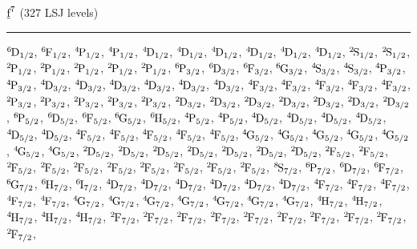 \begin{mdframed}
\begin{center}
$\forb^{7}$
(327 LSJ levels)
\vspace{0.25cm}
\hrule
\vspace{0.25cm}

$\LSJterm{6}{D}{1/2}$, $\LSJterm{6}{F}{1/2}$, $\LSJterm{4}{P}{1/2}$, $\LSJterm{4}{P}{1/2}$, $\LSJterm{4}{D}{1/2}$, $\LSJterm{4}{D}{1/2}$, $\LSJterm{4}{D}{1/2}$, $\LSJterm{4}{D}{1/2}$, $\LSJterm{4}{D}{1/2}$, $\LSJterm{4}{D}{1/2}$, $\LSJterm{2}{S}{1/2}$, $\LSJterm{2}{S}{1/2}$, $\LSJterm{2}{P}{1/2}$, $\LSJterm{2}{P}{1/2}$, $\LSJterm{2}{P}{1/2}$, $\LSJterm{2}{P}{1/2}$, $\LSJterm{2}{P}{1/2}$, $\LSJterm{6}{P}{3/2}$, $\LSJterm{6}{D}{3/2}$, $\LSJterm{6}{F}{3/2}$, $\LSJterm{6}{G}{3/2}$, $\LSJterm{4}{S}{3/2}$, $\LSJterm{4}{S}{3/2}$, $\LSJterm{4}{P}{3/2}$, $\LSJterm{4}{P}{3/2}$, $\LSJterm{4}{D}{3/2}$, $\LSJterm{4}{D}{3/2}$, $\LSJterm{4}{D}{3/2}$, $\LSJterm{4}{D}{3/2}$, $\LSJterm{4}{D}{3/2}$, $\LSJterm{4}{D}{3/2}$, $\LSJterm{4}{F}{3/2}$, $\LSJterm{4}{F}{3/2}$, $\LSJterm{4}{F}{3/2}$, $\LSJterm{4}{F}{3/2}$, $\LSJterm{4}{F}{3/2}$, $\LSJterm{2}{P}{3/2}$, $\LSJterm{2}{P}{3/2}$, $\LSJterm{2}{P}{3/2}$, $\LSJterm{2}{P}{3/2}$, $\LSJterm{2}{P}{3/2}$, $\LSJterm{2}{D}{3/2}$, $\LSJterm{2}{D}{3/2}$, $\LSJterm{2}{D}{3/2}$, $\LSJterm{2}{D}{3/2}$, $\LSJterm{2}{D}{3/2}$, $\LSJterm{2}{D}{3/2}$, $\LSJterm{2}{D}{3/2}$, $\LSJterm{6}{P}{5/2}$, $\LSJterm{6}{D}{5/2}$, $\LSJterm{6}{F}{5/2}$, $\LSJterm{6}{G}{5/2}$, $\LSJterm{6}{H}{5/2}$, $\LSJterm{4}{P}{5/2}$, $\LSJterm{4}{P}{5/2}$, $\LSJterm{4}{D}{5/2}$, $\LSJterm{4}{D}{5/2}$, $\LSJterm{4}{D}{5/2}$, $\LSJterm{4}{D}{5/2}$, $\LSJterm{4}{D}{5/2}$, $\LSJterm{4}{D}{5/2}$, $\LSJterm{4}{F}{5/2}$, $\LSJterm{4}{F}{5/2}$, $\LSJterm{4}{F}{5/2}$, $\LSJterm{4}{F}{5/2}$, $\LSJterm{4}{F}{5/2}$, $\LSJterm{4}{G}{5/2}$, $\LSJterm{4}{G}{5/2}$, $\LSJterm{4}{G}{5/2}$, $\LSJterm{4}{G}{5/2}$, $\LSJterm{4}{G}{5/2}$, $\LSJterm{4}{G}{5/2}$, $\LSJterm{4}{G}{5/2}$, $\LSJterm{2}{D}{5/2}$, $\LSJterm{2}{D}{5/2}$, $\LSJterm{2}{D}{5/2}$, $\LSJterm{2}{D}{5/2}$, $\LSJterm{2}{D}{5/2}$, $\LSJterm{2}{D}{5/2}$, $\LSJterm{2}{D}{5/2}$, $\LSJterm{2}{F}{5/2}$, $\LSJterm{2}{F}{5/2}$, $\LSJterm{2}{F}{5/2}$, $\LSJterm{2}{F}{5/2}$, $\LSJterm{2}{F}{5/2}$, $\LSJterm{2}{F}{5/2}$, $\LSJterm{2}{F}{5/2}$, $\LSJterm{2}{F}{5/2}$, $\LSJterm{2}{F}{5/2}$, $\LSJterm{2}{F}{5/2}$, $\LSJterm{8}{S}{7/2}$, $\LSJterm{6}{P}{7/2}$, $\LSJterm{6}{D}{7/2}$, $\LSJterm{6}{F}{7/2}$, $\LSJterm{6}{G}{7/2}$, $\LSJterm{6}{H}{7/2}$, $\LSJterm{6}{I}{7/2}$, $\LSJterm{4}{D}{7/2}$, $\LSJterm{4}{D}{7/2}$, $\LSJterm{4}{D}{7/2}$, $\LSJterm{4}{D}{7/2}$, $\LSJterm{4}{D}{7/2}$, $\LSJterm{4}{D}{7/2}$, $\LSJterm{4}{F}{7/2}$, $\LSJterm{4}{F}{7/2}$, $\LSJterm{4}{F}{7/2}$, $\LSJterm{4}{F}{7/2}$, $\LSJterm{4}{F}{7/2}$, $\LSJterm{4}{G}{7/2}$, $\LSJterm{4}{G}{7/2}$, $\LSJterm{4}{G}{7/2}$, $\LSJterm{4}{G}{7/2}$, $\LSJterm{4}{G}{7/2}$, $\LSJterm{4}{G}{7/2}$, $\LSJterm{4}{G}{7/2}$, $\LSJterm{4}{H}{7/2}$, $\LSJterm{4}{H}{7/2}$, $\LSJterm{4}{H}{7/2}$, $\LSJterm{4}{H}{7/2}$, $\LSJterm{4}{H}{7/2}$, $\LSJterm{2}{F}{7/2}$, $\LSJterm{2}{F}{7/2}$, $\LSJterm{2}{F}{7/2}$, $\LSJterm{2}{F}{7/2}$, $\LSJterm{2}{F}{7/2}$, $\LSJterm{2}{F}{7/2}$, $\LSJterm{2}{F}{7/2}$, $\LSJterm{2}{F}{7/2}$, $\LSJterm{2}{F}{7/2}$, $\LSJterm{2}{F}{7/2}$, 
\end{center}
\end{mdframed}
